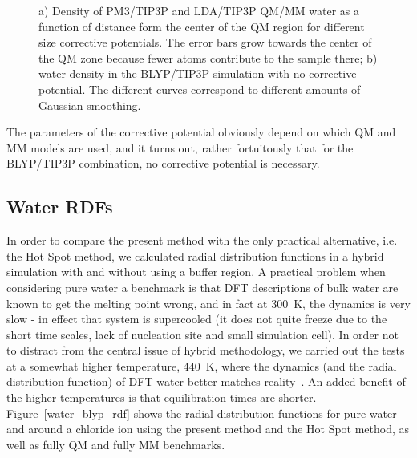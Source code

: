 \documentclass[11pt]{revtex4}
\begin{document}
\begin{figure}
\caption{a) Density of PM3/TIP3P and LDA/TIP3P QM/MM water as a function of distance form the center of the QM region for different size corrective potentials. The error bars grow towards the center of the QM zone because fewer atoms contribute to the sample there; b) water density in the BLYP/TIP3P simulation with no corrective potential. The different curves correspond to different amounts of Gaussian smoothing.}
\label{density}
\end{figure}

The parameters of the corrective potential obviously depend on which QM and MM models are used, and it turns out, rather fortuitously that for the BLYP/TIP3P combination, no corrective potential is necessary. 

\subsection{Water RDFs}
In order to compare the present method with the only practical alternative, i.e. the Hot Spot method, we calculated radial distribution functions in a hybrid simulation with and without using a buffer region.  A practical problem when considering pure water a benchmark is that DFT descriptions of bulk water are known to get the melting point wrong, and in fact at 300~K, the dynamics is very slow - in effect that system is supercooled (it does not quite freeze due to the short time scales, lack of nucleation site and small simulation cell). In order not to distract from the central issue of hybrid methodology, we carried out the tests at a somewhat higher temperature, 440~K, where the dynamics (and the radial distribution function) of DFT water better matches reality~\cite{yoo_j_chem_phys_2009a}. An added benefit of the higher temperatures is that equilibration times are shorter. Figure~\ref{water_blyp_rdf} shows the radial distribution functions for pure water and around a chloride ion using the present method and the Hot Spot method, as well as fully QM and fully MM benchmarks.
\end{document}
